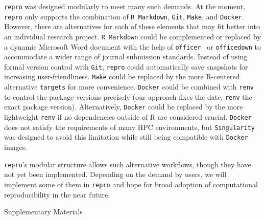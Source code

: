 \documentclass[psych,tutorial,accept,moreauthors,pdftex]{Definitions/mdpi}
\begin{document}
\begin{paracol}{2}
\texttt{repro} was designed modularly to meet many such demands. At the
moment, \texttt{repro} only supports the combination of
\texttt{R\ Markdown}, \texttt{Git}, \texttt{Make}, and \texttt{Docker}.
However, there are alternatives for each of these elements that may fit
better into an individual research project. \texttt{R\ Markdown} could
be complemented or replaced by a dynamic Microsoft Word document with
the help of \texttt{officer}~\citep{officer} or \texttt{officedown}
\citep{officedown} to accommodate a wider range of journal submission
standards. Instead of using formal version control with \texttt{Git},
\texttt{repro} could automatically save snapshots for increasing
user-friendliness. \texttt{Make} could be replaced by the more
R-centered alternative \texttt{targets} for more convenience.
\texttt{Docker} could be combined with \texttt{renv}~\citep{R-renv} to
control the package versions precisely (our approach fixes the date,
\texttt{renv} the exact package version). Alternatively, \texttt{Docker}
could be replaced by the more lightweight \texttt{renv} if no
dependencies outside of R are considered crucial. \texttt{Docker} does
not satisfy the requirements of many HPC environments, but
\texttt{Singularity} was designed to avoid this limitation while still
being compatible with \texttt{Docker} images.

\texttt{repro}'s modular structure allows such alternative workflows,
though they have not yet been implemented. Depending on the demand by
users, we will implement some of them in \texttt{repro} and hope for
broad adoption of computational reproducibility in the near future.



\vspace{6pt}

Supplementary Materials{\hl{\quad \quad}}%


\funding{\hl{\quad \quad}} %


\end{paracol}
\end{document}
